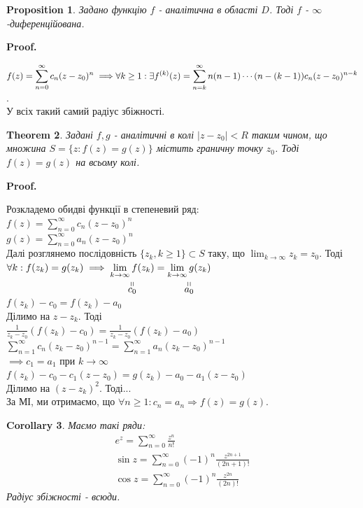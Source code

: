 \documentclass[a4paper, 10pt]{article}
\makeatletter
\def\stackbelow#1#2{\underset{\displaystyle\overset{\displaystyle\shortparallel}{#2}}{#1}}
\def\qed{$\blacksquare$}
\theoremstyle{theoremdd}
\newtheorem{theorem}{Theorem}[subsection]
\theoremstyle{theoremdd}
\theoremstyle{theoremdd}
\theoremstyle{theoremdd}
\theoremstyle{theoremdd}
\newtheorem{proposition}[theorem]{Proposition}
\theoremstyle{theoremdd}
\theoremstyle{theoremdd}
\theoremstyle{theoremdd}
\newtheorem{corollary}[theorem]{Corollary}
\renewenvironment{proof}[1][Proof.\\]{\par
\pushQED{\hfill \qed}%
\normalfont \topsep6\p@\@plus6\p@\relax
\trivlist
\item\relax
{\bfseries
#1\@addpunct{.}}\hspace\labelsep\ignorespaces
}{%
\popQED\endtrivlist\@endpefalse
}
\makeatother
\begin{document}
\begin{proposition}
Задано функцію $f$ - аналітична в області $D$. Тоді $f$ - $\infty$-диференційована.
\end{proposition}

\begin{proof}
$\displaystyle f(z)=\sum_{n=0}^{\infty} c_n(z-z_0)^n \implies \\ \forall k\geq1: \exists f^{(k)}(z) = \sum_{n=k}^{\infty} n(n-1) \cdots (n-(k-1))c_n(z-z_0)^{n-k}$. \\
У всіх такий самий радіус збіжності.
\end{proof}

\begin{theorem}
Задані $f,g$ - аналітичні в колі $|z-z_0|<R$ таким чином, що множина $S=\{z: f(z)=g(z)\}$ містить граничну точку $z_0$. Тоді $f(z)=g(z)$ на всьому колі.
\end{theorem}

\begin{proof}
Розкладемо обидві функції в степеневий ряд:\\
	$\displaystyle f(z)=\sum_{n=0}^{\infty} c_n(z-z_0)^n$\\
	$\displaystyle g(z)=\sum_{n=0}^{\infty} a_n(z-z_0)^n$\\
	Далі розглянемо послідовність $\{z_k, k\geq 1\} \subset S$ таку, що $\displaystyle\lim_{k\to\infty} z_k = z_0$. Тоді $\forall k: f(z_k)=g(z_k) \implies \stackbelow{\displaystyle\lim_{k\to\infty} f(z_k)}{c_0} = \stackbelow{\displaystyle\lim_{k\to\infty} g(z_k)}{a_0}$\\
	$f(z_k)-c_0=f(z_k)-a_0$\\
	Ділимо на $z-z_k$. Тоді\\
	$\displaystyle \frac{1}{z_k-z_0}(f(z_k)-c_0) = \frac{1}{z_k-z_0}(f(z_k)-a_0)$\\
	$\displaystyle \sum_{n=1}^{\infty} c_n(z_k-z_0)^{n-1} = \sum_{n=1}^{\infty} a_n(z_k-z_0)^{n-1}$\\
	$\implies c_1 = a_1$ при $k\to\infty$\\
	$f(z_k)-c_0-c_1(z-z_0) = g(z_k)-a_0-a_1(z-z_0)$\\
	Ділимо на $(z-z_k)^2$. Тоді...\\
	За МІ, ми отримаємо, що $\forall n \geq 1: c_n = a_n \Rightarrow f(z)=g(z)$.
\end{proof}

\begin{corollary}
Маємо такі ряди:
\begin{align*}
e^z = \sum_{n=0}^{\infty} \frac{z^n}{n!}\\
\sin z = \sum_{n=0}^{\infty} (-1)^n \frac{z^{2n+1}}{(2n+1)!}\\
\cos z = \sum_{n=0}^{\infty} (-1)^n \frac{z^{2n}}{(2n)!}
\end{align*}
Радіус збіжності - всюди.
\end{corollary}
\end{document}
